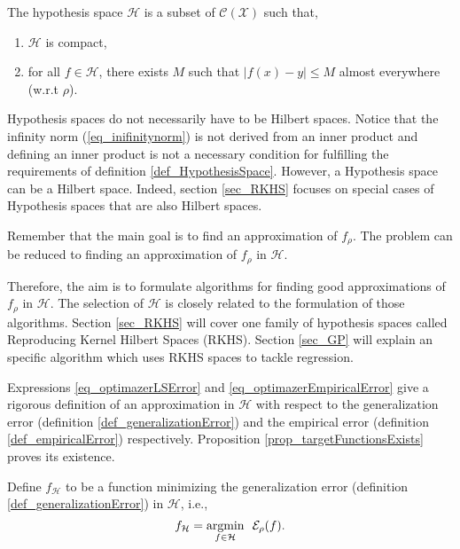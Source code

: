 \begin{definition} \label{def_HypothesisSpace}
  The hypothesis space $\mathcal{H}$ is a subset of $\mathcal{C}(\mathcal{X})$ such that,
  \begin{enumerate}
    \item $\mathcal{H}$ is compact,
    \item for all $f \in \mathcal{H}$, there exists $M$ such that $|f(x) - y| \leq M$ almost everywhere (w.r.t $\rho$). 
  \end{enumerate}  
\end{definition}

\begin{remark}
  Hypothesis spaces do not necessarily have to be Hilbert spaces. Notice that the infinity norm (\ref{eq_inifinitynorm}) is not derived from an inner product and defining an inner product is not a necessary condition for fulfilling the requirements of definition \ref{def_HypothesisSpace}. However, a Hypothesis space can be a Hilbert space. Indeed, section \ref{sec_RKHS} focuses on special cases of Hypothesis spaces that are also Hilbert spaces. 
\end{remark}

Remember that the main goal is to find an approximation of $f_{\rho}$. The problem can be reduced to finding an approximation of $f_{\rho}$ in $\mathcal{H}$. 

Therefore, the aim is to formulate algorithms for finding good approximations of $f_{\rho}$ in $\mathcal{H}$. The selection of $\mathcal{H}$ is closely related to the formulation of those algorithms. Section \ref{sec_RKHS} will cover one family of hypothesis spaces called Reproducing Kernel Hilbert Spaces (RKHS). Section \ref{sec_GP} will explain an specific algorithm which uses RKHS spaces to tackle regression. 

Expressions \ref{eq_optimazerLSError} and \ref{eq_optimazerEmpiricalError} give a rigorous definition of an approximation in $\mathcal{H}$ with respect to the generalization error (definition \ref{def_generalizationError}) and the empirical error (definition \ref{def_empiricalError}) respectively. Proposition \ref{prop_targetFunctionsExists} proves its existence.

\begin{definition} \label{def_targetFunction}
  Define $f_{\mathcal{H}}$ to be a function minimizing the generalization error (definition \ref{def_generalizationError}) in $\mathcal{H}$, i.e.,
  \begin{equation} \label{eq_optimazerLSError}
    f_{\mathcal{H}} = \underset{f \in \mathcal{H}}{\textup{argmin}} \ \ \mathcal{E}_{\rho}(f).
  \end{equation}
\end{definition}

